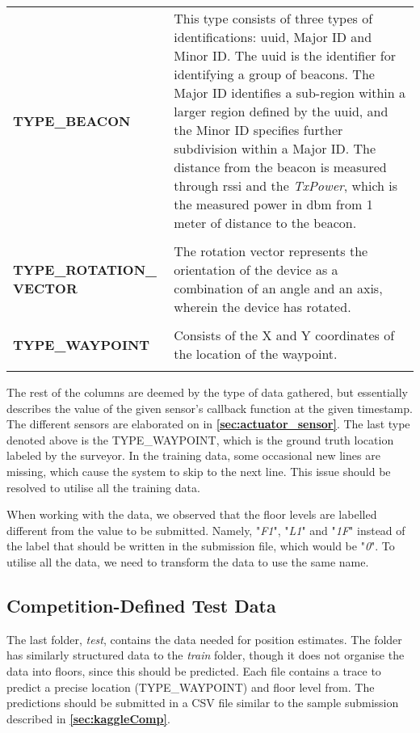 \begin{longtable}{ p{}  p{}}
\textbf{TYPE\_BEACON} & This type consists of three types of identifications: \gls{uuid}, Major ID and Minor ID. The \gls{uuid} is the identifier for identifying a group of beacons. The Major ID identifies a sub-region within a larger region defined by the \gls{uuid}, and the Minor ID specifies further subdivision within a Major ID. The distance from the beacon is measured through \gls{rssi} and the \textit{TxPower}, which is the measured power in \gls{dbm} from 1 meter of distance to the beacon.\cite{beaconsinfo}
\\\\

\textbf{TYPE\_ROTATION\_ \newline VECTOR} & The rotation vector represents the orientation of the device as a combination of an angle and an axis, wherein the device has rotated\cite{sensorevent}.
\\\\

\textbf{TYPE\_WAYPOINT} & Consists of the X and Y coordinates of the location of the waypoint.
\\\\

\end{longtable}

The rest of the columns are deemed by the type of data gathered, but essentially describes the value of the given sensor's callback function at the given timestamp. The different sensors are elaborated on in \textbf{\autoref{sec:actuator_sensor}}. The last type denoted above is the TYPE\_WAYPOINT, which is the ground truth location labeled by the surveyor.\cite{KaggleDataGithub} In the training data, some occasional new lines are missing, which cause the system to skip to the next line. This issue should be resolved to utilise all the training data.\cite{KaggleData}

When working with the data, we observed that the floor levels are labelled different from the value to be submitted. Namely, "\textit{F1}", "\textit{L1}" and "\textit{1F}" instead of the label that should be written in the submission file, which would be "\textit{0}". To utilise all the data, we need to transform the data to use the same name.

\subsection{Competition-Defined Test Data}
The last folder, \textit{test}, contains the data needed for position estimates. The folder has similarly structured data to the \textit{train} folder, though it does not organise the data into floors, since this should be predicted. Each file contains a trace to predict a precise location (TYPE\_WAYPOINT) and floor level from. The predictions should be submitted in a CSV file similar to the sample submission described in \textbf{\autoref{sec:kaggleComp}}.\cite{KaggleData}

